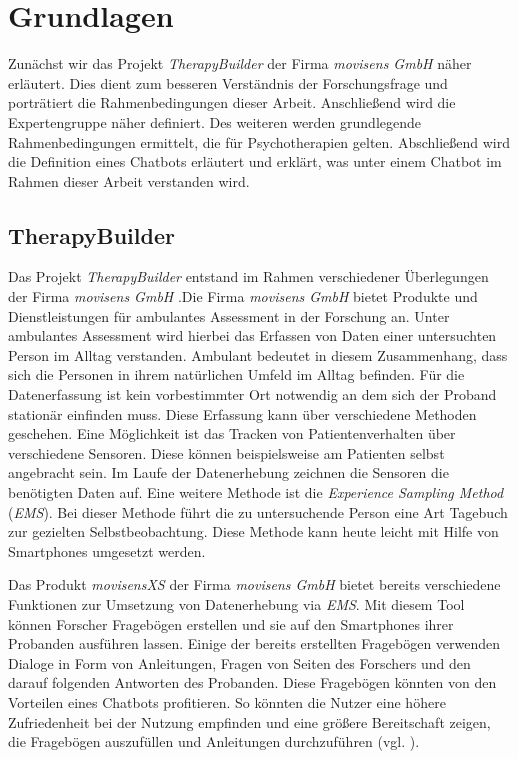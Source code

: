 
\chapter{Grundlagen}
\label{ch:Background}

Zunächst wir das Projekt \emph{TherapyBuilder} der Firma \emph{movisens GmbH} näher erläutert. Dies dient zum besseren Verständnis der Forschungsfrage und porträtiert die Rahmenbedingungen dieser Arbeit. Anschließend wird die Expertengruppe näher definiert. Des weiteren werden grundlegende Rahmenbedingungen ermittelt, die für Psychotherapien gelten. Abschließend wird die Definition eines Chatbots erläutert und erklärt, was unter einem Chatbot im Rahmen dieser Arbeit verstanden wird. 

\section{TherapyBuilder}

Das Projekt \emph{TherapyBuilder} entstand im Rahmen verschiedener Überlegungen der Firma \emph{movisens GmbH} .Die Firma \emph{movisens GmbH} bietet Produkte und Dienstleistungen für ambulantes Assessment in der Forschung an. Unter ambulantes Assessment wird hierbei das Erfassen von Daten einer untersuchten Person im Alltag verstanden. Ambulant bedeutet in diesem Zusammenhang, dass sich die Personen in ihrem natürlichen Umfeld im Alltag befinden. Für die Datenerfassung ist kein vorbestimmter Ort notwendig an dem sich der Proband stationär einfinden muss. Diese Erfassung kann über verschiedene Methoden geschehen. Eine Möglichkeit ist das Tracken von Patientenverhalten über verschiedene Sensoren. Diese können beispielsweise am Patienten selbst angebracht sein. Im Laufe der Datenerhebung zeichnen die Sensoren die benötigten Daten auf. Eine weitere Methode ist die \emph{Experience Sampling Method} (\emph{EMS}). Bei dieser Methode führt die zu untersuchende Person eine Art Tagebuch zur gezielten Selbstbeobachtung. Diese Methode kann heute leicht mit Hilfe von Smartphones umgesetzt werden.\cite{Assessme23:online} 

Das Produkt \emph{movisensXS} der Firma \emph{movisens GmbH} bietet bereits verschiedene Funktionen zur Umsetzung von Datenerhebung via \emph{EMS}. Mit diesem Tool können Forscher Fragebögen erstellen und sie auf den Smartphones ihrer Probanden ausführen lassen. Einige der bereits erstellten Fragebögen verwenden Dialoge in Form von Anleitungen, Fragen von Seiten des Forschers und den darauf folgenden Antworten des Probanden. Diese Fragebögen könnten von den Vorteilen eines Chatbots profitieren. So könnten die Nutzer eine höhere Zufriedenheit bei der Nutzung empfinden und eine größere Bereitschaft zeigen, die Fragebögen auszufüllen und Anleitungen durchzuführen (vgl. \cite{Fitzpatrick2017}). 

